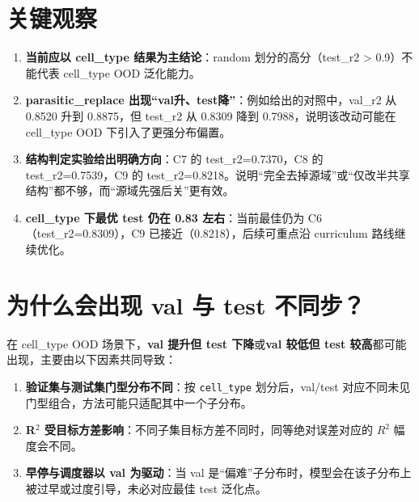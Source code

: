 \documentclass[12pt,a4paper]{ctexart}
\begin{document}
\section{关键观察}
\begin{enumerate}
  \item \textbf{当前应以 cell\_type 结果为主结论}：random 划分的高分（test\_r2 > 0.9）不能代表 cell\_type OOD 泛化能力。
  \item \textbf{parasitic\_replace 出现“val升、test降”}：例如给出的对照中，val\_r2 从 0.8520 升到 0.8875，但 test\_r2 从 0.8309 降到 0.7988，说明该改动可能在 cell\_type OOD 下引入了更强分布偏置。
  \item \textbf{结构判定实验给出明确方向}：C7 的 test\_r2=0.7370，C8 的 test\_r2=0.7539，C9 的 test\_r2=0.8218。说明“完全去掉源域”或“仅改半共享结构”都不够，而“源域先强后关”更有效。
  \item \textbf{cell\_type 下最优 test 仍在 0.83 左右}：当前最佳仍为 C6（test\_r2=0.8309），C9 已接近（0.8218），后续可重点沿 curriculum 路线继续优化。
\end{enumerate}

\section{为什么会出现 val 与 test 不同步？}
在 cell\_type OOD 场景下，\textbf{val 提升但 test 下降}或\textbf{val 较低但 test 较高}都可能出现，主要由以下因素共同导致：
\begin{enumerate}
  \item \textbf{验证集与测试集门型分布不同}：按 \texttt{cell\_type} 划分后，val/test 对应不同未见门型组合，方法可能只适配其中一个子分布。
  \item \textbf{R\(^2\) 受目标方差影响}：不同子集目标方差不同时，同等绝对误差对应的 \(R^2\) 幅度会不同。
  \item \textbf{早停与调度器以 val 为驱动}：当 val 是“偏难”子分布时，模型会在该子分布上被过早或过度引导，未必对应最佳 test 泛化点。
\end{enumerate}
\end{document}

